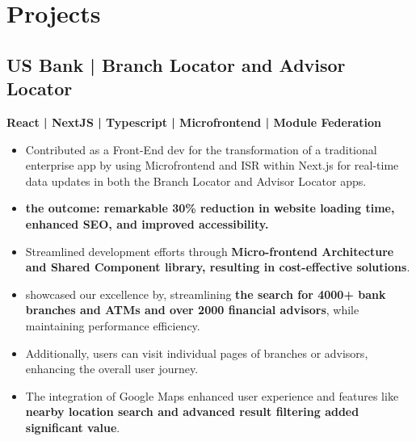 \documentclass[letterpaper]{deedy-resume} %
\begin{document}
\begin{minipage}[t]{0.66\textwidth}
\sectionspace %







\section{Projects}


\subsection{US Bank | Branch Locator\texorpdfstring{\href{https://www.usbank.com/locations/search/}{\faExternalLink}}{External Link} and Advisor Locator\texorpdfstring{\href{https://www.usbank.com/wealth-management/find-an-advisor/}{\faExternalLink}}{External Link}}

\textbf{React | NextJS | Typescript | Microfrontend | Module Federation}  \\

\begin{itemize}
    \setlength\itemsep{-0.5em} %
    \item Contributed as a Front-End dev for the transformation of a traditional enterprise app by using Microfrontend and ISR within Next.js for real-time data updates in both the Branch Locator and Advisor Locator apps.
    \item \textbf{the outcome: remarkable 30\% reduction in website loading time, enhanced SEO, and improved accessibility.}
    \item Streamlined development efforts through \textbf{Micro-frontend Architecture and Shared Component library, resulting in cost-effective solutions}.
    \item showcased our excellence by, streamlining \textbf{the search for 4000+ bank branches and ATMs and over 2000 financial advisors}, while maintaining performance efficiency.
    \item Additionally, users can visit individual pages of branches or advisors, enhancing the overall user journey.
    \item The integration of Google Maps enhanced user experience and features like \textbf{nearby location search and advanced result filtering added significant value}.
\end{itemize}


\end{minipage}
\end{document}
